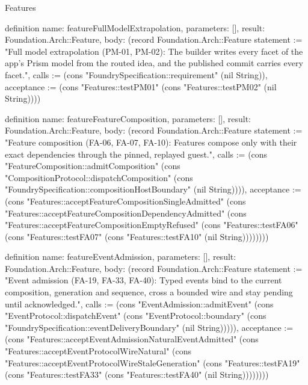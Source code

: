 \begin{lexlean}{Features}
\begin{semanticmodule}
definition{
  name: featureFullModelExtrapolation,
  parameters: [],
  result: Foundation.Arch::Feature,
  body: (record Foundation.Arch::Feature {statement := "Full model extrapolation (PM-01, PM-02): The builder writes every facet of the app's Prism model from the routed idea, and the published commit carries every facet.", calls := (cons "FoundrySpecification::requirement" (nil String)), acceptance := (cons "Features::testPM01" (cons "Features::testPM02" (nil String)))})
}

definition{
  name: featureFeatureComposition,
  parameters: [],
  result: Foundation.Arch::Feature,
  body: (record Foundation.Arch::Feature {statement := "Feature composition (FA-06, FA-07, FA-10): Features compose only with their exact dependencies through the pinned, replayed guest.", calls := (cons "FeatureComposition::admitComposition" (cons "CompositionProtocol::dispatchComposition" (cons "FoundrySpecification::compositionHostBoundary" (nil String)))), acceptance := (cons "Features::acceptFeatureCompositionSingleAdmitted" (cons "Features::acceptFeatureCompositionDependencyAdmitted" (cons "Features::acceptFeatureCompositionEmptyRefused" (cons "Features::testFA06" (cons "Features::testFA07" (cons "Features::testFA10" (nil String)))))))})
}

definition{
  name: featureEventAdmission,
  parameters: [],
  result: Foundation.Arch::Feature,
  body: (record Foundation.Arch::Feature {statement := "Event admission (FA-19, FA-33, FA-40): Typed events bind to the current composition, generation and sequence, cross a bounded wire and stay pending until acknowledged.", calls := (cons "EventAdmission::admitEvent" (cons "EventProtocol::dispatchEvent" (cons "EventProtocol::boundary" (cons "FoundrySpecification::eventDeliveryBoundary" (nil String))))), acceptance := (cons "Features::acceptEventAdmissionNaturalEventAdmitted" (cons "Features::acceptEventProtocolWireNatural" (cons "Features::acceptEventProtocolWireStaleGeneration" (cons "Features::testFA19" (cons "Features::testFA33" (cons "Features::testFA40" (nil String)))))))})
}


\end{semanticmodule}
\end{lexlean}
